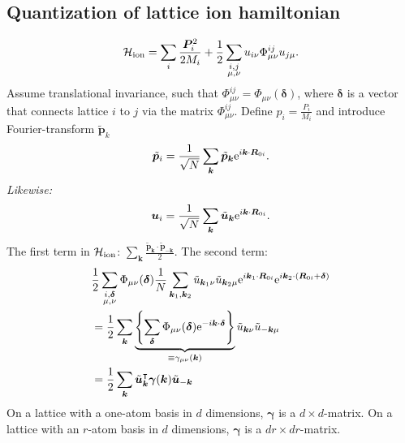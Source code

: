 \subsection{Quantization of lattice ion hamiltonian}
\begin{equation}
	\Ha_{\text{ion}} = \sum_{i}\frac{\bm{P}_i^2}{2M_i} + \frac{1}{2}\sum_{\mathclap{\substack{i,j\\ \mu,\nu}}}u_{i\nu}\Phi_{\mu\nu}^{ij}u_{j\mu}.
\end{equation}
Assume translational invariance, such that $\Phi_{\mu\nu}^{ij} =\Phi_{\mu\nu}(\bm{\delta})$, where $\bm{\delta}$ is a vector that connects lattice $i$ to $j$ via the matrix $\Phi_{\mu\nu}^{ij}$. Define $p_i = \frac{P_i}{M_i}$ and introduce Fourier-transform $\tilde{\bm{p}}_k$
\begin{equation}
	\tilde{\bm{p}}_i = \frac{1}{\sqrt{N}}\sum_{\bm{k}}\tilde{\bm{p}}_{\bm{k}}\mathrm{e}^{i\bm{k}\cdot \bm{R}_{0i}}.
\end{equation} 
\emph{Likewise:}
\begin{equation}
	\bm{u}_i = \frac{1}{\sqrt{N}}\sum_{\bm{k}}\tilde{\bm{u}}_{\bm{k}}\mathrm{e}^{i\bm{k}\cdot \bm{R}_{0i}}.
\end{equation}
The first term in $\mathcal{H}_{\text{ion}}$: $\sum_{\bm{k}}\frac{\tilde{\bm{p}}_{\bm{k}}\cdot\tilde{\bm{p}}_{-\bm{k}}}{2}$.
The second term:
\begin{align}
	&\frac{1}{2}\sum_{\mathclap{\substack{i,\bm{\delta} \\ \mu,\nu}}}\Phi_{\mu\nu}(\bm{\delta})\frac{1}{N}\sum_{\bm{k}_1,\bm{k}_2}\tilde{{u}}_{\bm{k}_1 \nu}\tilde{{u}}_{\bm{k}_2 \mu}\e^{i\bm{k}_1\cdot \vR_{0i}}\e^{i\bm{k}_2\cdot (\vR_{0i} + \bm{\delta})} \\
	&= \frac{1}{2}\sum_{\bm{k}}\underbrace{\left \{\sum_{\bm{\delta}}\Phi_{\mu\nu}(\bm{\delta})\e^{-i\bm{k}\cdot\bm{\delta}} \right \}}_{\equiv\gamma_{\mu\nu}(\bm{k})}\tilde{{u}}_{\bm{k} \nu}\tilde{{u}}_{-\bm{k} \mu} \\
	&= \frac{1}{2}\sum_{\bm{k}}\tilde{\bm{u}}_{\bm{k}}^{\intercal}\bm{\gamma}(\bm{k})\tilde{\bm{u}}_{-\bm{k}}
\end{align}
On a lattice with a one-atom basis in $d$ dimensions, $\bm{\gamma}$ is a $d\times d$-matrix. 
On a lattice with an $r$-atom basis in $d$ dimensions, $\bm{\gamma}$ is a $dr\times dr$-matrix.

